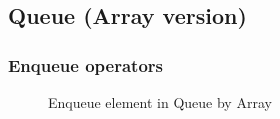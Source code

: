 \subsection{Queue (Array version)}

\subsubsection{Enqueue operators}

\begin{figure}[H]
    \centering
    \qquad
    \caption{Enqueue element in Queue by Array}%
    \label{fig:queueArrayEnqueue}%
\end{figure}

